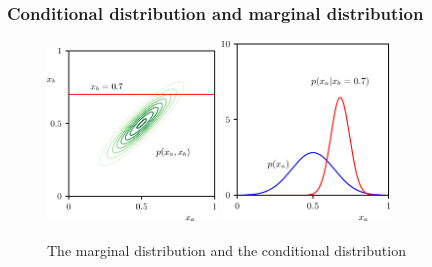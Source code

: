 \documentclass{beamer}
\begin{document}
\begin{frame}
    \frametitle{Conditional distribution and marginal distribution}
    \begin{figure}
        \caption{The marginal distribution and the conditional distribution}
        \includegraphics[width=0.4\textwidth]{Figure_5_a.pdf}
        \includegraphics[width=0.4\textwidth]{Figure_5_b.pdf}
    \end{figure}
\end{frame}
\end{document}
